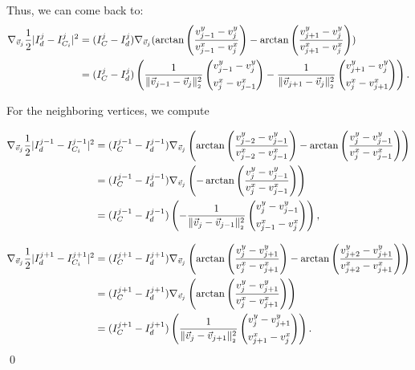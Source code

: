 \begin{proposition}
	Thus, we can come back to: 
	\begin{align*}
		\nabla_{\vec{v}_j} \frac{1}{2}| I^{j}_d - I^{j}_{C_i} |^2 
		&= (I^j_{C} - I^{j}_d) \nabla_{\vec{v}_j} (\arctan\left(\frac{v_{j-1}^{y} - v_{j}^{y}}{v_{j-1}^{x} - v_{j}^{x}}\right) - \arctan\left(\frac{v_{j+1}^{y} - v_{j}^{y}}{v_{j+1}^{x} - v_{j}^{x}}\right)) \\
		&= (I^j_{C} - I^{j}_d) \left( 
		  \frac{1}{\norm[\vec{v}_{j-1} - \vec{v}_j]^2} \begin{pmatrix}
			v_{j-1}^{y} - v_{j}^{y} \\[0.5em]
			v_{j}^{x} - v_{j-1}^{x}
		\end{pmatrix} 
		- \frac{1}{\norm[\vec{v}_{j+1} - \vec{v}_j]^2} \begin{pmatrix}
			v_{j+1}^{y} - v_{j}^{y} \\[0.5em]
			v_{j}^{x} - v_{j+1}^{x}
		\end{pmatrix} \right).
	\end{align*}

	For the neighboring vertices, we compute 

	\begin{align*}
		\nabla_{\vec{v}_j} \frac{1}{2}| I^{j-1}_d - I^{j-1}_{C_i} |^2 
		&= (I^{j-1}_{C} - I^{j-1}_d) \nabla_{\vec{v}_j} \left(\arctan\left(\frac{v_{j-2}^{y} - v_{j-1}^{y}}{v_{j-2}^{x} - v_{j-1}^{x}}\right) - \arctan\left(\frac{v_{j}^{y} - v_{j-1}^{y}}{v_{j}^{x} - v_{j-1}^{x}}\right)\right) \\
		&= (I^{j-1}_{C} - I^{j-1}_d) \nabla_{\vec{v}_j} \left(- \arctan\left(\frac{v_{j}^{y} - v_{j-1}^{y}}{v_{j}^{x} - v_{j-1}^{x}}\right)\right) \\
		&= (I^{j-1}_{C} - I^{j-1}_d) \left( 
		 - \frac{1}{\norm[\vec{v}_{j} - \vec{v}_{j-1}]^2} \begin{pmatrix}
			v_{j}^{y} - v_{j-1}^{y} \\[0.5em]
			v_{j-1}^{x} - v_{j}^{x}
		\end{pmatrix} \right),
	\end{align*}

	\begin{align*}
		\nabla_{\vec{v}_j} \frac{1}{2}| I^{j+1}_d - I^{j+1}_{C_i} |^2 
		&= (I^{j+1}_{C} - I^{j+1}_d) \nabla_{\vec{v}_j} \left(\arctan\left(\frac{v_{j}^{y} - v_{j+1}^{y}}{v_{j}^{x} - v_{j+1}^{x}}\right) - \arctan\left(\frac{v_{j+2}^{y} - v_{j+1}^{y}}{v_{j+2}^{x} - v_{j+1}^{x}}\right)\right) \\
		&= (I^{j+1}_{C} - I^{j+1}_d) \nabla_{\vec{v}_j} \left( \arctan\left(\frac{v_{j}^{y} - v_{j+1}^{y}}{v_{j}^{x} - v_{j+1}^{x}}\right) \right) \\
		&= (I^{j+1}_{C} - I^{j+1}_d) \left( 
		 \frac{1}{\norm[\vec{v}_{j} - \vec{v}_{j+1}]^2} \begin{pmatrix}
			v_{j}^{y} - v_{j+1}^{y} \\[0.5em]
			v_{j+1}^{x} - v_{j}^{x}
		\end{pmatrix} \right).
	\end{align*}
	\qed
\end{proposition}

